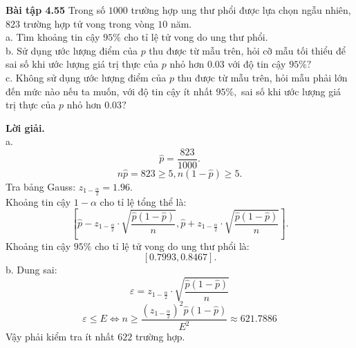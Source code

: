 \documentclass[12pt,a4paper]{article}
\begin{document}
\begin{mybox}
\textbf{Bài tập 4.55} Trong số $1000$ trường hợp ung thư phổi được lựa chọn ngẫu nhiên, $823$ trường hợp tử vong trong vòng $10$ năm.\\
a. Tìm khoảng tin cậy $95\%$ cho tỉ lệ tử vong do ung thư phổi.\\
b. Sử dụng ước lượng điểm của $p$ thu được từ mẫu trên, hỏi cỡ mẫu tối thiểu để sai số khi ước lượng giá trị thực của $p$ nhỏ hơn $0.03$ với độ tin cậy $95\%?$\\
c. Không sử dụng ước lượng điểm của $p$ thu được từ mẫu trên, hỏi mẫu phải lớn đến mức nào nếu ta muốn, với độ tin cậy ít nhất $95\%,$ sai số khi ước lượng giá trị thực của $p$ nhỏ hơn $0.03?$ 
\end{mybox}
\textbf{Lời giải.}\\
a. $$ \widehat{p} = \frac{823}{1000}.$$
$$n\widehat{p} = 823 \geqslant 5, n \left( {1 - \widehat{p}} \right) \geqslant 5.$$
Tra bảng Gauss: $z_{1 - \frac{\alpha}{2}} = 1.96.$\\
Khoảng tin cậy $1 - \alpha$ cho tỉ lệ tổng thể là:
$$\left[ {\widehat{p} - z_{1 - \frac{\alpha}{2}} \cdot \sqrt{\frac{\widehat{p} \left( {1 - \widehat{p}} \right)}{n}}, \widehat{p} + z_{1 - \frac{\alpha}{2}} \cdot \sqrt{\frac{\widehat{p} \left( {1 - \widehat{p}} \right)}{n}}} \right].$$
Khoảng tin cậy $95\%$ cho tỉ lệ tử vong do ung thư phổi là:
$$\left[ {0.7993, 0.8467} \right].$$
b. Dung sai:
$$\varepsilon = z_{1 - \frac{\alpha}{2}} \cdot \sqrt{\frac{\widehat{p} \left( {1 - \widehat{p}} \right)}{n}}$$
$$\varepsilon \leqslant E \Leftrightarrow n \geqslant \frac{{{{\left( {{z_{1 - \frac{\alpha }{2}}}} \right)}^2}\widehat p\left( {1 - \widehat p} \right)}}{{{E^2}}} \approx 621.7886$$
Vậy phải kiểm tra ít nhất $622$ trường hợp.
\end{document}
